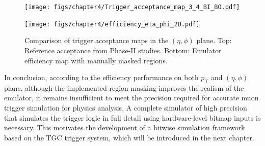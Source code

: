 \begin{figure}[htbp]
  \centering
  \texttt{[image: figs/chapter4/Trigger\_acceptance\_map\_3\_4\_BI\_BO.pdf]}
  \vspace{0.5em}
  
  \texttt{[image: figs/chapter4/efficiency\_eta\_phi\_2D.pdf]}
  
  \caption{Comparison of trigger acceptance maps in the $(\eta, \phi)$ plane. Top: Reference acceptance from Phase-II studies. Bottom: Emulator efficiency map with manually masked regions.}
  \label{fig:eta_phi_comparison}
\end{figure}

In conclusion, according to the efficiency performance on both $p_\mathrm{T}$ and $(\eta, \phi)$ plane, although the implemented region masking improves the realism of the emulator, it remains insufficient to meet the precision required for accurate muon trigger simulation for physics analysis. A complete simulator of high precision that simulates the trigger logic in full detail using hardware-level bitmap inputs is necessary. This motivates the development of a bitwise simulation framework based on the TGC trigger system, which will be introduced in the next chapter.
